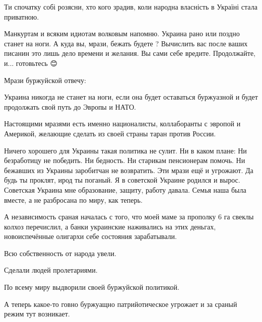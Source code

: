 \begin{itemize}
\begin{itemize}
Ти спочатку собі розясни, хто кого зрадив, коли народна власність в Україні стала приватною.
\end{itemize}

 
Манкуртам и всяким идиотам волковым напомню.
Украина рано или поздно станет на ноги.
А куда вы, мрази, бежать будете ?
Вычислить вас после ваших писанин это лишь дело времени и желания.
Вы сами себе вредите. Продолжайте, и... готовьтесь
😊

\begin{itemize}
 

Мрази буржуйской отвечу:

Украина никогда не станет на ноги, если она будет оставаться буржуазной и будет
продолжать свой путь до Эвропы и НАТО.

Настоящими мразями есть именно националисты, коллаборанты с эвропой и Америкой,
желающие сделать из своей страны таран против России.

\obeycr
Ничего хорошего для Украины такая политика не сулит.
Ни в каком плане:
Ни безработицу не победить.
Ни бедность.
Ни старикам пенсионерам помочь.
Ни бежавших из Украины заробитчан не возвратить.
Эти мрази ещё и угрожают.
Да будь ты проклят, ирод ты поганый.
Я в советской Украине родился и вырос.
Советская Украина мне образование, защиту, работу давала.
Семья наша была вместе, а не разбросана по миру, как теперь.
\restorecr

А независимость сраная началась с того, что моей маме за прополку 6 га свеклы
колхоз перечислил, а банки украинские наживались на этих деньгах,
новоиспечённые олигархи себе состояния зарабатывали.

Всю собственность от народа увели.

Сделали людей пролетариями.

По всему миру выдворили своей буржуйской политикой.

А теперь какое-то говно буржуащно патрийотическое угрожает и за сраный режим
тут возникает.


\end{itemize}
\end{itemize}
